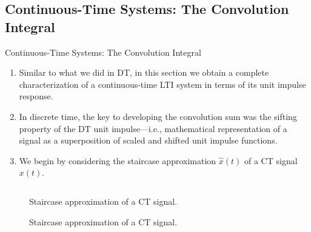 \subsection{Continuous-Time Systems: The Convolution Integral}

\begin{frame}{Continuous-Time Systems: The Convolution Integral}
    \begin{enumerate}
        \item Similar to what we did in DT, in this section we obtain a complete characterization of a continuous-time LTI system in terms of its unit impulse response.
        \item In discrete time, the key to developing the convolution sum was the sifting property of the DT unit impulse---i.e., mathematical representation of a signal as  a superposition of scaled and shifted unit impulse functions.
        \item We begin by considering the staircase approximation $\hat{x}(t)$ of a CT signal $x(t)$.
    \end{enumerate}

    {
        \begin{columns}
        \end{columns}
    }
\end{frame}

\begin{frame}[plain,t]
    {
    \begin{figure}
      \centering
      
      \caption{Staircase approximation of a CT signal.}\label{fi:ct_sifting}
    \end{figure}
    }
    {
    \begin{figure}
      \centering
      
      \caption{Staircase approximation of a CT signal.}\label{fi:ct_sifting_handout}
    \end{figure}
    }
\end{frame}




